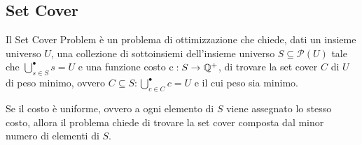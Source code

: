 \subsection*{Set Cover}
Il Set Cover Problem è un problema di ottimizzazione che chiede, dati un insieme universo $U$, una collezione di sottoinsiemi dell'insieme universo $S \subseteq \mathcal{P}(U)$ tale che $\bigcup\limits_{s \in S}^{\bullet} s = U$ e una funzione costo $\textnormal{c}: S \rightarrow \mathbb{Q}^+$, di trovare la set cover $C$ di $U$ di peso minimo, ovvero $C \subseteq S : \bigcup\limits_{c \in C}^{\bullet} c = U$ e il cui peso sia minimo.

Se il costo è uniforme, ovvero a ogni elemento di $S$ viene assegnato lo stesso costo, allora il problema chiede di trovare la set cover composta dal minor numero di elementi di $S$.

